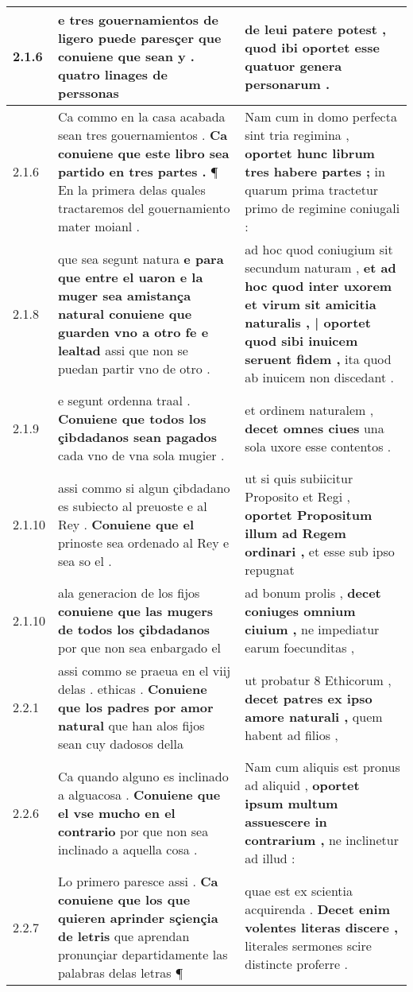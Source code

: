 \begin{tabular}{|p{1cm}|p{6.5cm}|p{6.5cm}|}
2.1.6 & e tres gouernamientos de ligero puede paresçer \textbf{ que conuiene que sean y . } quatro linages de perssonas & de leui patere potest , \textbf{ quod ibi oportet } esse quatuor genera personarum . \\\hline
2.1.6 & Ca commo en la casa acabada sean tres gouernamientos . \textbf{ Ca conuiene que este libro sea partido en tres partes . } ¶ En la primera delas quales tractaremos del gouernamiento mater moianl . & Nam cum in domo perfecta sint tria regimina , \textbf{ oportet hunc librum tres habere partes ; } in quarum prima tractetur primo de regimine coniugali : \\\hline
2.1.8 & que sea segunt natura \textbf{ e para que entre el uaron e la muger sea amistança natural conuiene que guarden vno a otro fe e lealtad } assi que non se puedan partir vno de otro . & ad hoc quod coniugium sit secundum naturam , \textbf{ et ad hoc quod inter uxorem et virum sit amicitia naturalis , | oportet quod sibi inuicem seruent fidem , } ita quod ab inuicem non discedant . \\\hline
2.1.9 & e segunt ordenna traal . \textbf{ Conuiene que todos los çibdadanos sean pagados } cada vno de vna sola mugier . & et ordinem naturalem , \textbf{ decet omnes ciues } una sola uxore esse contentos . \\\hline
2.1.10 & assi commo si algun çibdadano es subiecto al preuoste e al Rey . \textbf{ Conuiene que el } prinoste sea ordenado al Rey e sea so el . & ut si quis subiicitur Proposito et Regi , \textbf{ oportet Propositum illum ad Regem ordinari , } et esse sub ipso repugnat \\\hline
2.1.10 & ala generacion de los fijos \textbf{ conuiene que las mugers de todos los çibdadanos } por que non sea enbargado el & ad bonum prolis , \textbf{ decet coniuges omnium ciuium , } ne impediatur earum foecunditas , \\\hline
2.2.1 & assi commo se praeua en el viij delas . ethicas . \textbf{ Conuiene que los padres por amor natural } que han alos fijos sean cuy dadosos della & ut probatur 8 Ethicorum , \textbf{ decet patres ex ipso amore naturali , } quem habent ad filios , \\\hline
2.2.6 & Ca quando alguno es inclinado a alguacosa . \textbf{ Conuiene que el vse mucho en el contrario } por que non sea inclinado a aquella cosa . & Nam cum aliquis est pronus ad aliquid , \textbf{ oportet ipsum multum assuescere in contrarium , } ne inclinetur ad illud : \\\hline
2.2.7 & Lo primero paresce assi . \textbf{ Ca conuiene que los que quieren aprinder sçiençia de letris } que aprendan pronunçiar departidamente las palabras delas letras ¶ & quae est ex scientia acquirenda . \textbf{ Decet enim volentes literas discere , } literales sermones scire distincte proferre . \\\hline

\end{tabular}
